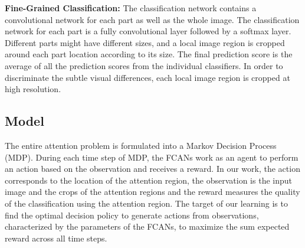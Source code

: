 \documentclass[10pt,twocolumn,letterpaper]{article}
\begin{document}
\textbf{Fine-Grained Classification:}
The classification network contains a convolutional network for each part as well as the whole image.
The classification network for each part is a fully convolutional layer followed by a softmax layer.
Different parts might have different sizes, and a local image region is cropped around each part location according to its size.
The final prediction score is the average of all the prediction scores from the individual classifiers.
In order to discriminate the subtle visual differences, each local image region is cropped at high resolution.




\subsection{Model}
The entire attention problem is formulated into a Markov Decision Process (MDP).
During each time step of MDP, the FCANs work as an agent to perform an action based on the observation and receives a reward.
In our work, the action corresponds to the location of the attention region, the observation is the input image and the crops of the attention regions and the reward measures the quality of the classification using the attention region.
The target of our learning is to find the optimal decision policy to generate actions from observations, characterized by the parameters of the FCANs, to maximize the sum expected reward across all time steps.
\end{document}
